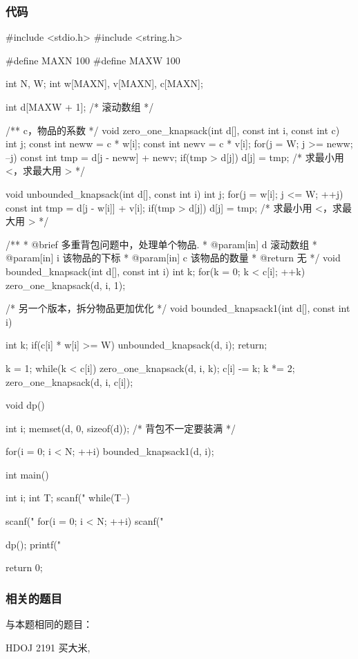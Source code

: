 \subsubsection{代码}
\begin{Codex}[label=bkp.c]
#include <stdio.h>
#include <string.h>

#define MAXN 100
#define MAXW 100

int N, W;
int w[MAXN], v[MAXN], c[MAXN];

int d[MAXW + 1]; /* 滚动数组 */

/** c，物品的系数 */
void zero_one_knapsack(int d[], const int i, const int c) {
    int j;
    const int neww = c * w[i];
    const int newv = c * v[i];
    for(j = W; j >= neww; --j) {
        const int tmp = d[j - neww] + newv;
        if(tmp > d[j]) d[j] = tmp;  /* 求最小用 <，求最大用 > */
    }
}

void unbounded_knapsack(int d[], const int i) {
    int j;
    for(j = w[i]; j <= W; ++j) {
        const int tmp = d[j - w[i]] + v[i];
        if(tmp > d[j]) d[j] = tmp; /* 求最小用 <，求最大用 > */
    }
}

/**
 * @brief 多重背包问题中，处理单个物品.
 * @param[in] d 滚动数组
 * @param[in] i 该物品的下标
 * @param[in] c 该物品的数量
 * @return 无
 */
void bounded_knapsack(int d[], const int i) {
    int k;
    for(k = 0; k < c[i]; ++k) {
        zero_one_knapsack(d, i, 1);
    }
}

/* 另一个版本，拆分物品更加优化 */
void bounded_knapsack1(int d[], const int i) {
    int k;
    if(c[i] * w[i] >= W) {
        unbounded_knapsack(d, i);
        return;
    }

    k = 1;
    while(k < c[i]) {
        zero_one_knapsack(d, i, k);
        c[i] -= k;
        k *= 2;
    }
    zero_one_knapsack(d, i, c[i]);
}

void dp() {
    int i;
    memset(d, 0, sizeof(d)); /* 背包不一定要装满 */

    for(i = 0; i < N; ++i) bounded_knapsack1(d, i);
}
 
int main() {
    int i;
    int T;
    scanf("%
    while(T--) {
        scanf("%
        for(i = 0; i < N; ++i) scanf("%

        dp();
        printf("%
    }
    return 0;
}
\end{Codex}

\subsubsection{相关的题目}
与本题相同的题目：
\begindot
\item HDOJ 2191 买大米, 
\myenddot


